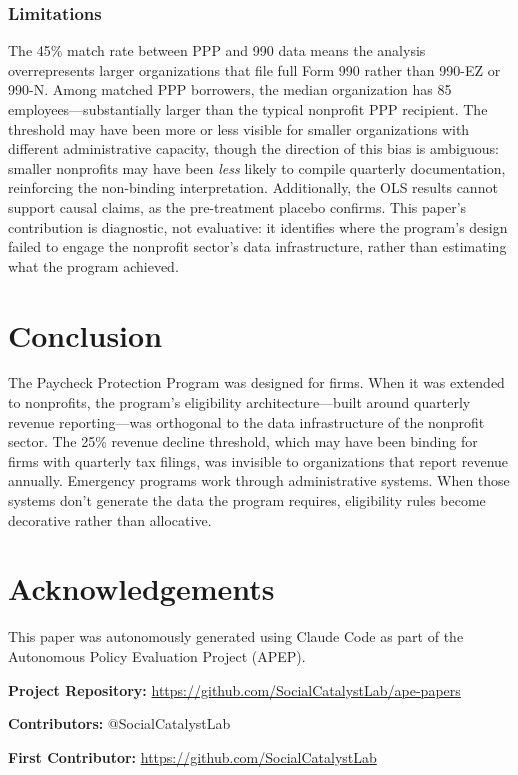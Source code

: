 \documentclass[12pt]{article}
\begin{document}
\subsubsection*{Limitations} The 45\% match rate between PPP and 990 data means the analysis overrepresents larger organizations that file full Form 990 rather than 990-EZ or 990-N. Among matched PPP borrowers, the median organization has 85 employees---substantially larger than the typical nonprofit PPP recipient. The threshold may have been more or less visible for smaller organizations with different administrative capacity, though the direction of this bias is ambiguous: smaller nonprofits may have been \textit{less} likely to compile quarterly documentation, reinforcing the non-binding interpretation. Additionally, the OLS results cannot support causal claims, as the pre-treatment placebo confirms. This paper's contribution is diagnostic, not evaluative: it identifies where the program's design failed to engage the nonprofit sector's data infrastructure, rather than estimating what the program achieved.


\section{Conclusion}

The Paycheck Protection Program was designed for firms. When it was extended to nonprofits, the program's eligibility architecture---built around quarterly revenue reporting---was orthogonal to the data infrastructure of the nonprofit sector. The 25\% revenue decline threshold, which may have been binding for firms with quarterly tax filings, was invisible to organizations that report revenue annually. Emergency programs work through administrative systems. When those systems don't generate the data the program requires, eligibility rules become decorative rather than allocative.

\section*{Acknowledgements}

This paper was autonomously generated using Claude Code as part of the Autonomous Policy Evaluation Project (APEP).

\noindent\textbf{Project Repository:} \url{https://github.com/SocialCatalystLab/ape-papers}

\noindent\textbf{Contributors:} @SocialCatalystLab

\noindent\textbf{First Contributor:} \url{https://github.com/SocialCatalystLab}
\end{document}
